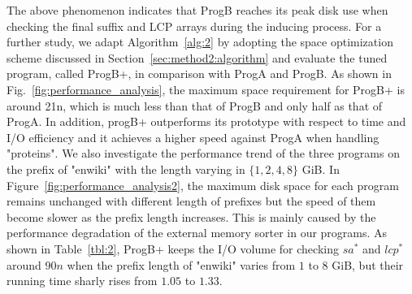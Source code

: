 \documentclass[10pt,journal,compsoc]{IEEEtran}
\begin{document}
The above phenomenon indicates that ProgB reaches its peak disk use when checking the final suffix and LCP arrays during the inducing process. For a further study, we adapt Algorithm~\ref{alg:2} by adopting the space optimization scheme discussed in Section~\ref{sec:method2:algorithm} and evaluate the tuned program, called ProgB+, in comparison with ProgA and ProgB. As shown in Fig.~\ref{fig:performance_analysis}, the maximum space requirement for ProgB+ is around 21n, which is much less than that of ProgB and only half as that of ProgA. In addition, progB+ outperforms its prototype with respect to time and I/O efficiency and it achieves a higher speed against ProgA when handling "proteins". We also investigate the performance trend of the three programs on the prefix of "enwiki" with the length varying in $\{1, 2, 4, 8\}$ GiB. In Figure~\ref{fig:performance_analysis2}, the maximum disk space for each program remains unchanged with different length of prefixes but the speed of them become slower as the prefix length increases. This is mainly caused by the performance degradation of the external memory sorter in our programs. As shown in Table~\ref{tbl:2}, ProgB+ keeps the I/O volume for checking $sa^*$ and $lcp^*$ around $90n$ when the prefix length of "enwiki" varies from $1$ to $8$ GiB, but their running time sharly rises from $1.05$ to $1.33$.
\end{document}
